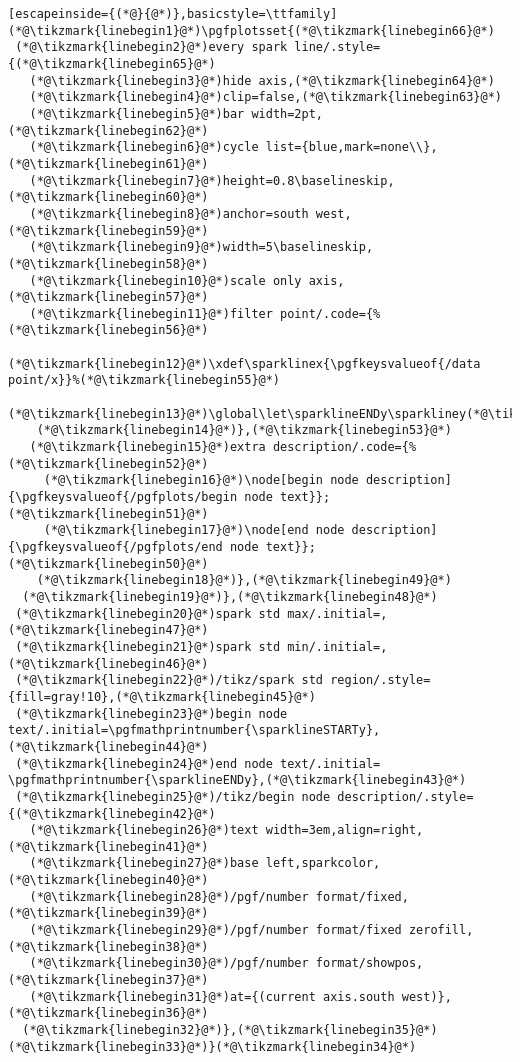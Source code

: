 \documentclass[11pt]{article}
\newcommand{\tikzmark}[1]{%
	\tikz[overlay,remember picture] \node[text=black,
		inner sep=2pt] (#1) {};}
\begin{document}
\pagestyle{empty}
\begin{lstlisting}[escapeinside={(*@}{@*)},basicstyle=\ttfamily]
(*@\tikzmark{linebegin1}@*)\pgfplotsset{(*@\tikzmark{linebegin66}@*)
 (*@\tikzmark{linebegin2}@*)every spark line/.style={(*@\tikzmark{linebegin65}@*)
   (*@\tikzmark{linebegin3}@*)hide axis,(*@\tikzmark{linebegin64}@*)
   (*@\tikzmark{linebegin4}@*)clip=false,(*@\tikzmark{linebegin63}@*)
   (*@\tikzmark{linebegin5}@*)bar width=2pt,(*@\tikzmark{linebegin62}@*)
   (*@\tikzmark{linebegin6}@*)cycle list={blue,mark=none\\},(*@\tikzmark{linebegin61}@*)
   (*@\tikzmark{linebegin7}@*)height=0.8\baselineskip,(*@\tikzmark{linebegin60}@*)
   (*@\tikzmark{linebegin8}@*)anchor=south west,(*@\tikzmark{linebegin59}@*)
   (*@\tikzmark{linebegin9}@*)width=5\baselineskip,(*@\tikzmark{linebegin58}@*)
   (*@\tikzmark{linebegin10}@*)scale only axis,(*@\tikzmark{linebegin57}@*)
   (*@\tikzmark{linebegin11}@*)filter point/.code={%(*@\tikzmark{linebegin56}@*)
     (*@\tikzmark{linebegin12}@*)\xdef\sparklinex{\pgfkeysvalueof{/data point/x}}%(*@\tikzmark{linebegin55}@*)
     (*@\tikzmark{linebegin13}@*)\global\let\sparklineENDy\sparkliney(*@\tikzmark{linebegin54}@*)
    (*@\tikzmark{linebegin14}@*)},(*@\tikzmark{linebegin53}@*)
   (*@\tikzmark{linebegin15}@*)extra description/.code={%(*@\tikzmark{linebegin52}@*)
     (*@\tikzmark{linebegin16}@*)\node[begin node description]  {\pgfkeysvalueof{/pgfplots/begin node text}};(*@\tikzmark{linebegin51}@*)
     (*@\tikzmark{linebegin17}@*)\node[end node description]    {\pgfkeysvalueof{/pgfplots/end node text}};(*@\tikzmark{linebegin50}@*)
    (*@\tikzmark{linebegin18}@*)},(*@\tikzmark{linebegin49}@*)
  (*@\tikzmark{linebegin19}@*)},(*@\tikzmark{linebegin48}@*)
 (*@\tikzmark{linebegin20}@*)spark std max/.initial=,(*@\tikzmark{linebegin47}@*)
 (*@\tikzmark{linebegin21}@*)spark std min/.initial=,(*@\tikzmark{linebegin46}@*)
 (*@\tikzmark{linebegin22}@*)/tikz/spark std region/.style={fill=gray!10},(*@\tikzmark{linebegin45}@*)
 (*@\tikzmark{linebegin23}@*)begin node text/.initial=\pgfmathprintnumber{\sparklineSTARTy},(*@\tikzmark{linebegin44}@*)
 (*@\tikzmark{linebegin24}@*)end node text/.initial=  \pgfmathprintnumber{\sparklineENDy},(*@\tikzmark{linebegin43}@*)
 (*@\tikzmark{linebegin25}@*)/tikz/begin node description/.style={(*@\tikzmark{linebegin42}@*)
   (*@\tikzmark{linebegin26}@*)text width=3em,align=right,(*@\tikzmark{linebegin41}@*)
   (*@\tikzmark{linebegin27}@*)base left,sparkcolor,(*@\tikzmark{linebegin40}@*)
   (*@\tikzmark{linebegin28}@*)/pgf/number format/fixed,(*@\tikzmark{linebegin39}@*)
   (*@\tikzmark{linebegin29}@*)/pgf/number format/fixed zerofill,(*@\tikzmark{linebegin38}@*)
   (*@\tikzmark{linebegin30}@*)/pgf/number format/showpos,(*@\tikzmark{linebegin37}@*)
   (*@\tikzmark{linebegin31}@*)at={(current axis.south west)},(*@\tikzmark{linebegin36}@*)
  (*@\tikzmark{linebegin32}@*)},(*@\tikzmark{linebegin35}@*)
(*@\tikzmark{linebegin33}@*)}(*@\tikzmark{linebegin34}@*)
\end{lstlisting}
\end{document}
